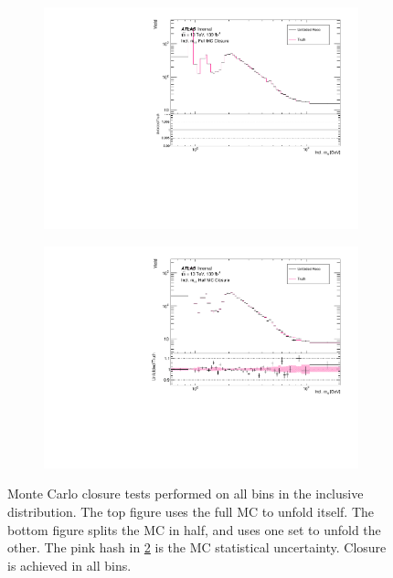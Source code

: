 \begin{figure}
    \begin{subfigure}{.88\textwidth}\centering
        \includegraphics[width=0.90\linewidth]{Figures/m4l/MCClosure/FullMCClosure_inclm4l.pdf}\caption{}\label{fig:fullMCclosure}
    \end{subfigure}
        \begin{subfigure}{.8\textwidth}\centering
        \includegraphics[width=0.99\linewidth]{Figures/m4l/MCClosure/HalfMCClosure_inclm4l.pdf}\caption{}\label{fig:halfMCclosure}
    \end{subfigure}
    \caption{Monte Carlo closure tests performed on all bins in the inclusive \mFourL{} distribution. The top figure uses the full MC to unfold itself. The bottom figure splits the MC in half, and uses one set to unfold the other. The pink hash in \ref{fig:halfMCclosure} is the MC statistical uncertainty. Closure is achieved in all bins.}
    \label{fig:MCclosure}
\end{figure}

